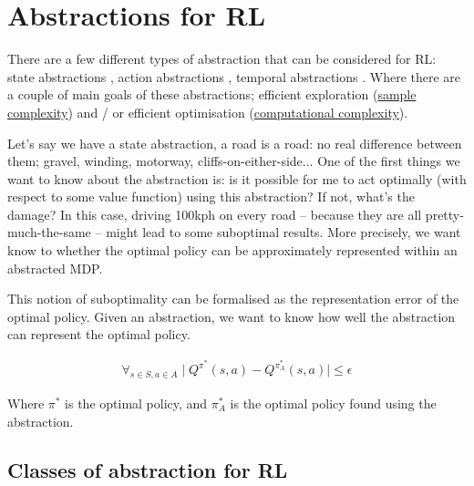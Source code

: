 \section{Abstractions for RL}

There are a few different types of abstraction that can be considered for RL:
state abstractions \cite{Littman2006,Haarnoja,Cuccu2018,Zhonga,Vezzani2019,Abel2018,Duan2018,Abel2017,Silver2016a},
action abstractions \cite{Chandak2019,Bester2019,Tennenholtz2019}, temporal abstractions \cite{Rafati,Mankowitz2018,Harutyunyan2017,Fruit2017,Riemer2018,Bacon2018,Achiam2018,Pham2019,Konidaris2018,Haarnoja,Sutton1999,Fruit2017a,Bacon2016a,Jinnai2018,Nachum2018}.
Where there are a couple of main goals of these abstractions; efficient exploration
(\href{https://en.wikipedia.org/wiki/Sample_complexity}{sample complexity})
and / or efficient optimisation (\href{https://en.wikipedia.org/wiki/Computational_complexity_theory}{computational complexity}).

Let's say we have a state abstraction, a road is a road: no real difference
between them; gravel, winding, motorway, cliffs-on-either-side...
One of the first things we want to know about the abstraction is:
is it possible for me to act optimally (with respect to some value function)
using this abstraction? If not, what's the damage? In this case, driving 100kph on every road --
because they are all pretty-much-the-same -- might lead to some suboptimal results.
More precisely, we want know to whether the optimal policy can be approximately represented within an abstracted MDP.

This notion of suboptimality can be formalised as the representation error of the optimal
policy. Given an abstraction, we want to know how well
the abstraction can represent the optimal policy. \cite{Littman2006, Abel2017}

\begin{align}
\forall_{s\in S, a\in A} \mid Q^{\pi^* }(s, a) - Q^{\pi_{A}^* }(s, a) \mid \le \epsilon
\end{align}

Where $\pi^{* }$ is the optimal policy, and $\pi_{A}^{* }$ is the optimal
policy found using the abstraction.

\subsection{Classes of abstraction for RL}

